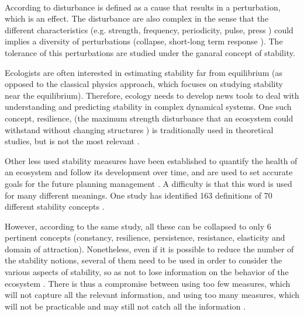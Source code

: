 \documentclass{article}
\begin{document}
\paragraph{} %
According to \cite{rykiel_towards_1985} disturbance is defined as a cause that results in a perturbation, which is an effect. The disturbance are also complex in the sense that the different characteristics (e.g. strength, frequency, periodicity, pulse, press \citep{bender1984perturbation}) could implies a diversity of perturbations (collapse, short-long term response \citep{arnoldi2018ecosystems}). The tolerance of this perturbations are studied under the ganaral concept of stability.


\label{stability_litterature}
Ecologists are often interested in estimating stability far from equilibrium (as opposed to the classical physics approach, which focuses on studying stability near the equilibrium). Therefore, ecology needs to develop news tools to deal with understanding and predicting stability in complex dynamical systems. 
One such concept, resilience, (the maximum strength disturbance that an ecosystem could  withstand without changing structures \citep{holling_resilience_1973}) is traditionally used in theoretical studies, but is not the most relevant %
\citep{gunderson_ecological_2000, neubert_alternatives_1997}.

Other less used stability measures have been established to quantify the health of an ecosystem and follow its development over time, and are used to set accurate goals for the future planning management \citep {donohue_navigating_2016, mayer_strengths_2008}. A difficulty is that this word is used for many different meanings. One study has identified 163 definitions of 70 different stability concepts \citep{grimm_babel_1997}.

However, according to the same study, all these can be collapsed to only 6 pertinent concepts (constancy,  resilience,  persistence,  resistance,  elasticity and domain of attraction). Nonetheless, even if it is possible to reduce the number of the stability notions, several of them need to be used in order to consider the various aspects of stability, so as not to lose information on the behavior of the ecosystem \citep{derissen_relationship_2011}. There is thus a compromise between using too few measures, which will not capture all the relevant information, and using too many measures, which will not be practicable and may still not catch all the information \citep{hillebrand_decomposing_2018, donohue_dimensionality_2013}.
\end{document}
